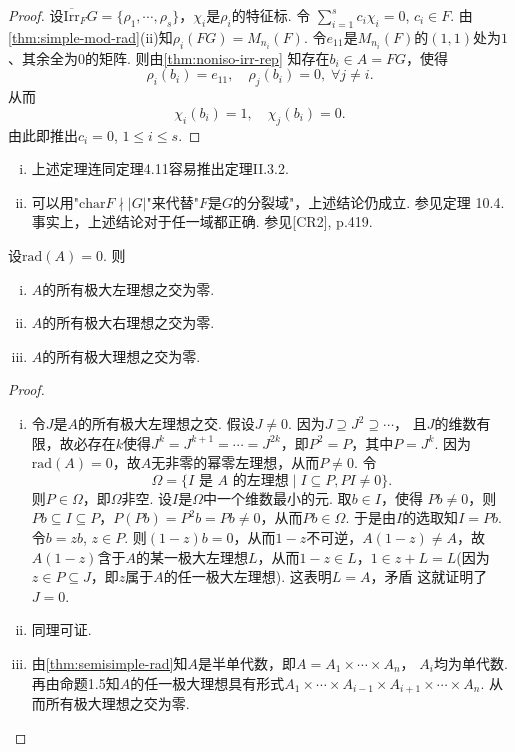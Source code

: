 \begin{proof}
    设$\overline{\mathrm{Irr}}_F G = \{\rho_1, \cdots, \rho_s\}$，$\chi_i$是$\rho_i$的特征标. 令
    $\sum_{i=1}^s c_i \chi_i = 0$, $c_i \in F$. 由\cref{thm:simple-mod-rad}(ii)知$\rho_i(FG) =
    M_{n_i}(F)$. 令$e_{11}$是$M_{n_i}(F)$的$(1,1)$处为$1$、其余全为$0$的矩阵. 则由\cref{thm:noniso-irr-rep}
    知存在$b_i \in A = FG$，使得
    \[ \rho_i(b_i) = e_{11}, \quad \rho_j(b_i) = 0, \; \forall j \neq i. \]
    从而
    \[ \chi_i(b_i) = 1, \quad \chi_j(b_i) = 0. \]
    由此即推出$c_i = 0$, $1 \leq i \leq s$.
\end{proof}

\begin{note}
    \begin{enumerate}[(i)]
        \item 上述定理连同定理4.11容易推出定理II.3.2.
        \item 可以用"$\mathrm{char} F \nmid |G|$"来代替"$F$是$G$的分裂域"，上述结论仍成立. 参见定理
        10.4. 事实上，上述结论对于任一域都正确. 参见[CR2], p.419.
    \end{enumerate}
\end{note}

\begin{lemma}
    设$\mathrm{rad}(A) = 0$. 则
    \begin{enumerate}[(i)]
        \item $A$的所有极大左理想之交为零.
        \item $A$的所有极大右理想之交为零.
        \item $A$的所有极大理想之交为零.
    \end{enumerate}
\end{lemma}

\begin{proof}
    \begin{enumerate}[(i)]
        \item 令$J$是$A$的所有极大左理想之交. 假设$J \neq 0$. 因为$J \supseteq J^2 \supseteq \cdots$，
        且$J$的维数有限，故必存在$k$使得$J^k = J^{k+1} = \cdots = J^{2k}$，即$P^2 = P$，其中$P =
        J^k$. 因为$\mathrm{rad}(A) = 0$，故$A$无非零的幂零左理想，从而$P \neq 0$. 令
        \[ \Omega = \{ I \text{ 是 } A \text{ 的左理想} \mid I \subseteq P, PI \neq 0 \}. \]
        则$P \in \Omega$，即$\Omega$非空. 设$I$是$\Omega$中一个维数最小的元. 取$b \in I$，使得
        $Pb \neq 0$，则$Pb \subseteq I \subseteq P$，$P(Pb) = P^2 b = Pb \neq 0$，从而$Pb \in \Omega$.
        于是由$I$的选取知$I = Pb$. 令$b = zb$, $z \in P$. 则$(1-z)b = 0$，从而$1-z$不可逆，$A(1-z)
        \neq A$，故$A(1-z)$含于$A$的某一极大左理想$L$，从而$1-z \in L$，$1 \in z + L = L$(因为$z
        \in P \subseteq J$，即$z$属于$A$的任一极大左理想). 这表明$L = A$，矛盾\! 这就证明了$J = 0$.
        \item 同理可证.
        \item 由\cref{thm:semisimple-rad}知$A$是半单代数，即$A = A_1 \times \cdots \times A_n$，
        $A_i$均为单代数. 再由命题1.5知$A$的任一极大理想具有形式$A_1 \times \cdots \times A_{i-1}
        \times A_{i+1} \times \cdots \times A_n$. 从而所有极大理想之交为零. \qedhere
    \end{enumerate}
\end{proof}

